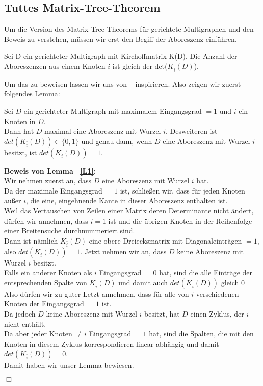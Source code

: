 \subsection{Tuttes Matrix-Tree-Theorem}
Um die Version des Matrix-Tree-Theorems für gerichtete Multigraphen und den Beweis zu verstehen, müssen wir erst den Begiff der Aboreszenz einführen.
\begin{Tms}
Sei D ein gerichteter Multigraph mit Kirchoffmatrix K(D). Die Anzahl der Aboreszenzen aus einem Knoten $i$ ist gleich der det($K_{\bar{i}}(D)$).
\end{Tms}
Um das zu beweisen lassen wir uns von ~\cite{bang-jensen_2009} inspirieren.
Also zeigen wir zuerst folgendes Lemma:
\begin{Lms}
Sei $D$ ein gerichteter Multigraph mit maximalem Eingangsgrad $=1$ und $i$ ein Knoten in $D$.\\
Dann hat $D$ maximal eine Aboreszenz mit Wurzel $i$. Desweiteren ist $det(K_{\bar{i}}(D)) \in \{0,1\}$
und genau dann, wenn $D$ eine Aboreszenz mit Wurzel $i$ besitzt, ist $det(K_{\bar{i}}(D)) = 1$.
\label{L1}
\end{Lms}
\textbf{Beweis von Lemma ~\ref{L1}:}\\
Wir nehmen zuerst an, dass $D$ eine Aboreszenz mit Wurzel $i$ hat.\\
Da der maximale Eingangsgrad $=1$ ist, schließen wir, dass für jeden Knoten außer $i$, die eine, eingehnende Kante in dieser Aboreszenz enthalten ist. \\
Weil das Vertauschen von Zeilen einer Matrix deren Determinante nicht ändert, dürfen wir annehmen, dass $i=1$ ist und die übrigen Knoten in der Reihenfolge einer Breitensuche durchnummeriert sind.\\ 
Dann ist nämlich $K_{\bar{i}}(D)$ eine obere Dreiecksmatrix mit Diagonaleinträgen $=1$, also $det(K_{\bar{i}}(D)) = 1$.
Jetzt nehmen wir an, dass $D$ keine Aboreszenz mit Wurzel $i$ besitzt.\\
Falls ein anderer Knoten als $i$ Eingangsgrad $=0$ hat, sind die alle Einträge der entsprechenden Spalte von $K_{\bar{i}}(D)$ und damit auch $det(K_{\bar{i}}(D))$ gleich $0$\\
Also dürfen wir zu guter Letzt annehmen, dass für alle von $i$ verschiedenen Knoten der Eingangsgrad $=1$ ist.\\
Da jedoch $D$ keine Aboreszenz mit Wurzel $i$ besitzt, hat $D$ einen Zyklus, der $i$ nicht enthält.\\
Da aber jeder Knoten $\neq i$ Eingangsgrad $=1$ hat, sind die Spalten, die mit den Knoten in diesem Zyklus korrespondieren linear abhängig und damit $det(K_{\bar{i}}(D)) = 0$.\\
Damit haben wir unser Lemma bewiesen.
\begin{flushright} $\Box$ \end{flushright} 

